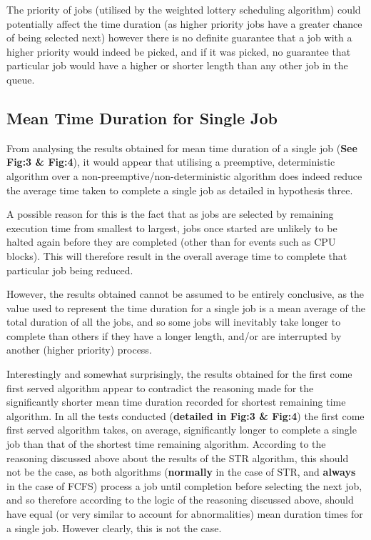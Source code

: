 \documentclass{acm_proc_article-sp}
\begin{document}
The priority of jobs (utilised by the weighted lottery scheduling algorithm) could potentially affect the time duration (as higher priority jobs have a greater chance of being selected next) however there is no definite guarantee that a job with a higher priority would indeed be picked, and if it was picked, no guarantee that particular job would have a higher or shorter length than any other job in the queue.

\subsection{Mean Time Duration for Single Job}

From analysing the results obtained for mean time duration of a single job (\textbf{See Fig:3 \& Fig:4}), it would appear that utilising a preemptive, deterministic algorithm over a non-preemptive/non-deterministic algorithm does indeed reduce the average time taken to complete a single job as detailed in hypothesis three. 

A possible reason for this is the fact that as jobs are selected by remaining execution time from smallest to largest, jobs once started are unlikely to be halted again before they are completed (other than for events such as CPU blocks). This will therefore result in the overall average time to complete that particular job being reduced. 

However, the results obtained cannot be assumed to be entirely conclusive,  as the value used to represent the time duration for a single job is a mean average of the total duration of all the jobs, and so some jobs will inevitably take longer to complete than others if they have a longer length, and/or are interrupted by another (higher priority) process.

Interestingly and somewhat surprisingly, the results obtained for the first come first served algorithm appear to contradict the reasoning made for the significantly shorter mean time duration recorded for shortest remaining time algorithm. In all the tests conducted (\textbf{detailed in Fig:3 \& Fig:4}) the first come first served algorithm takes, on average, significantly longer to complete a single job than that of the shortest time remaining algorithm. According to the reasoning discussed above about the results of the STR algorithm, this should not be the case, as both algorithms (\textbf{normally} in the case of STR, and \textbf{always} in the case of FCFS) process a job until completion before selecting the next job, and so therefore according to the logic of the reasoning discussed above, should have equal (or very similar to account for abnormalities) mean duration times for a single job. However clearly, this is not the case. 
\end{document}
